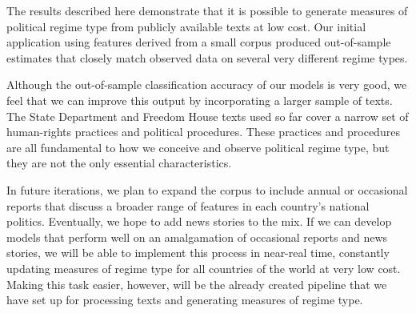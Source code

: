 \documentclass[pdftex,12pt,fullpage,oneside]{amsart}
\begin{document}
The results described here demonstrate that it is possible to generate measures of political regime type from publicly available texts at low cost. Our initial application using features derived from a small corpus produced out-of-sample estimates that closely match observed data on several very different regime types.

Although the out-of-sample classification accuracy of our models is very good, we feel that we can improve this output by incorporating a larger sample of texts. The State Department and Freedom House texts used so far cover a narrow set of human-rights practices and political procedures. These practices and procedures are all fundamental to how we conceive and observe political regime type, but they are not the only essential characteristics.

In future iterations, we plan to expand the corpus to include annual or occasional reports that discuss a broader range of features in each country's national politics. Eventually, we hope to add news stories to the mix. If we can develop models that perform well on an amalgamation of occasional reports and news stories, we will be able to implement this process in near-real time, constantly updating measures of regime type for all countries of the world at very low cost. Making this task easier, however, will be the already created pipeline that we have set up for processing texts and generating measures of regime type. 

\newpage


\end{document}
